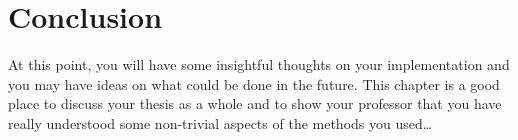 \chapter{Conclusion}
\label{chapter:concluion}

At this point, you will have some insightful thoughts on your implementation
and you may have ideas on what could be done in the future. 
This chapter is a good place to discuss your thesis as a whole and to show your
professor that you have really understood some non-trivial aspects of the
methods you used\ldots

